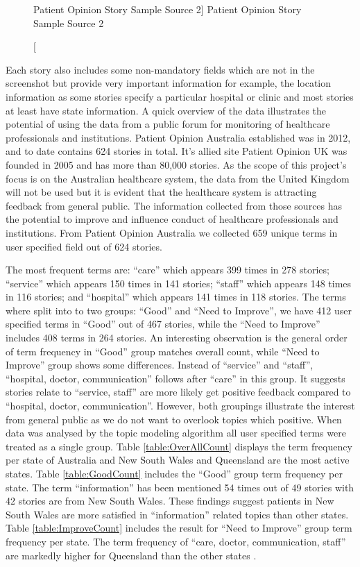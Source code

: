 \documentclass[11pt,twoside]{report}
\begin{document}
\begin{figure}[h]
    \begin{center}
    \caption
    [Patient Opinion Story Sample Source 2]
    {
    Patient Opinion Story Sample Source 2
    \label{Figure3}
    }
    \end{center}
\end{figure}
Each story also includes some non-mandatory fields which are not in the screenshot but provide very important information for example, the location information as some stories specify a particular hospital or clinic and most stories at least have state information. A quick overview of the data illustrates the potential of using the data from a public forum for monitoring of healthcare professionals and institutions. Patient Opinion Australia established was in 2012, and to date contains 624 stories in total. It's allied site Patient Opinion UK was founded in 2005 and has more than 80,000 stories. As the scope of this project's focus is on the Australian healthcare system, the data from the United Kingdom will not be used but it is evident that the healthcare system is attracting feedback from general public. The information collected from those sources has the potential to improve and influence conduct of healthcare professionals and institutions. From Patient Opinion Australia we collected 659 unique terms in user specified field out of 624 stories. 

The most frequent terms are: ``care'' which appears 399 times in 278 stories; ``service'' which appears 150 times in 141 stories; ``staff'' which appears 148 times in 116 stories; and ``hospital'' which appears 141 times in 118 stories. The terms where split into to two groups: ``Good'' and ``Need to Improve'', we have 412 user specified terms in ``Good'' out of 467 stories, while the ``Need to Improve'' includes 408 terms in 264 stories. An interesting observation is the general order of term frequency in ``Good'' group matches overall count, while ``Need to Improve'' group shows some differences. Instead of ``service'' and ``staff'', ``hospital, doctor, communication'' follows after ``care'' in this group. It suggests stories relate to ``service, staff'' are more likely get positive feedback compared to ``hospital, doctor, communication''. However, both groupings illustrate the interest from general public as we do not want to overlook topics which positive. When data was analysed by the topic modeling algorithm all user specified terms were treated as a single group. Table \ref{table:OverAllCount} displays the term frequency per state of Australia and New South Wales and Queensland are the most active states. Table \ref{table:GoodCount} includes the ``Good'' group term frequency per state. The term ``information'' has been mentioned 54 times out of 49 stories with 42 stories are from New South Wales. These findings suggest patients in New South Wales are more satisfied in ``information'' related topics than other states. Table \ref{table:ImproveCount} includes the result for ``Need to Improve'' group term frequency per state. The term frequency of  ``care, doctor, communication, staff'' are markedly higher for Queensland than the other states . 
\end{document}
